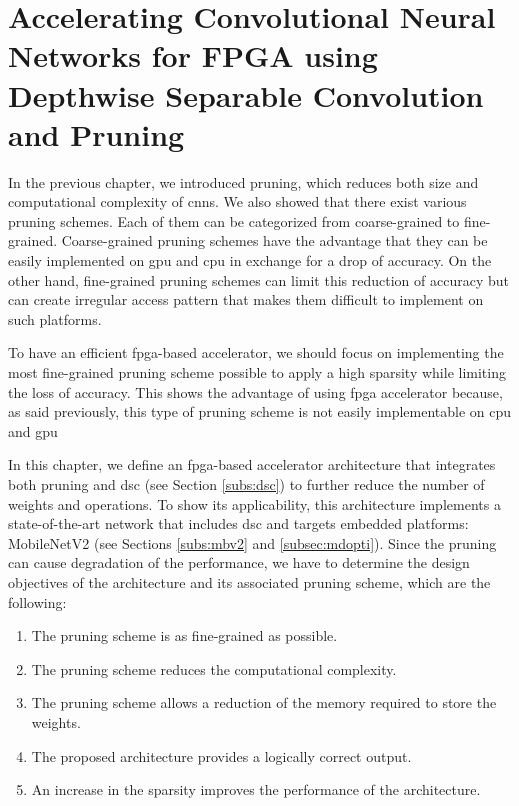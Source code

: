 \chapter{Accelerating Convolutional Neural Networks for FPGA using Depthwise Separable Convolution and Pruning} \label{chap:pratique}
%
%
In the previous chapter, we introduced pruning, which reduces both size and computational complexity of \acrshort{cnn}s. We also showed that there exist various pruning schemes. Each of them can be categorized from coarse-grained to fine-grained. Coarse-grained pruning schemes have the advantage that they can be easily implemented on \acrshort{gpu} and \acrshort{cpu} in exchange for a drop of accuracy. On the other hand, fine-grained pruning schemes can limit this reduction of accuracy but can create irregular access pattern that makes them difficult to implement on such platforms. 

To have an efficient \acrshort{fpga}-based accelerator, we should focus on implementing the most fine-grained pruning scheme possible to apply a high sparsity while limiting the loss of accuracy. This shows the advantage of using \acrshort{fpga} accelerator because, as said previously, this type of pruning scheme is not easily implementable on \acrshort{cpu} and \acrshort{gpu}

In this chapter, we define an \acrshort{fpga}-based accelerator architecture that integrates both pruning and \acrshort{dsc} (see Section \ref{subs:dsc}) to further reduce the number of weights and operations. To show its applicability, this architecture implements a state-of-the-art network that includes \acrshort{dsc} and targets embedded platforms: MobileNetV2 (see Sections \ref{subs:mbv2} and \ref{subsec:mdopti}). Since the pruning can cause degradation of the performance, we have to determine the design objectives of the architecture and its associated pruning scheme, which are the following:
%
\begin{enumerate}
    \item The pruning scheme is as fine-grained as possible.
    \item The pruning scheme reduces the computational complexity.
    \item The pruning scheme allows a reduction of the memory required to store the weights.
    \item The proposed architecture provides a logically correct output.
    \item An increase in the sparsity improves the performance of the architecture.
\end{enumerate}

